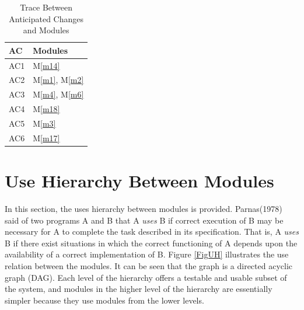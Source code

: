 \documentclass[12pt]{article}
\newcommand{\mref}[1]{M\ref{#1}}
\begin{document}
\begin{table}[H]
\centering
\begin{tabular}{p{} p{}}
\toprule
\textbf{AC} & \textbf{Modules}\\
\midrule
AC1 & \mref{m14}\\
AC2 & \mref{m1}, \mref{m2}\\
AC3 & \mref{m4}, \mref{m6}\\
AC4 & \mref{m18}\\
AC5 & \mref{m3}\\
AC6 & \mref{m17}\\
\bottomrule
\end{tabular}
\caption{Trace Between Anticipated Changes and Modules}
\label{TblACT}
\end{table}
\newpage
\section{Use Hierarchy Between Modules} \label{SecUse}
In this section, the uses hierarchy between modules is
provided. Parnas(1978) said of two programs A and B that A {\em uses} B if
correct execution of B may be necessary for A to complete the task described in
its specification. That is, A {\em uses} B if there exist situations in which
the correct functioning of A depends upon the availability of a correct
implementation of B.  Figure \ref{FigUH} illustrates the use relation between
the modules. It can be seen that the graph is a directed acyclic graph
(DAG). Each level of the hierarchy offers a testable and usable subset of the
system, and modules in the higher level of the hierarchy are essentially simpler
because they use modules from the lower levels.
\end{document}
